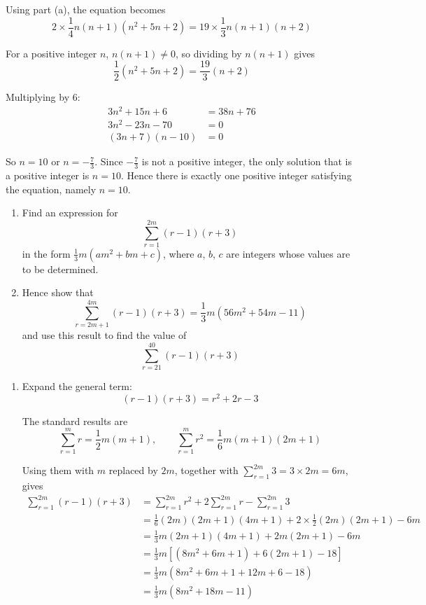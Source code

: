 \documentclass[leqno]{article}
\begin{document}
\begin{enumerate}[
  label=\textbf{\arabic*.},
  leftmargin=*,
  topsep=0pt,
  partopsep=0pt,
  parsep=0pt
]
\begin{djsSolution}
\begin{enumerate}[label=\textbf{(\alph*)}, start=1]
Using part (a), the equation becomes
\[
2\times\frac14 n(n+1)\left(n^2+5n+2\right)=19\times\frac13 n(n+1)(n+2)
\]

For a positive integer \(n\), \(n(n+1)\neq 0\), so dividing by \(n(n+1)\) gives
\[
\frac12\left(n^2+5n+2\right)=\frac{19}{3}(n+2)
\]

Multiplying by \(6\):
\begin{align*}
3n^2+15n+6&=38n+76\\
3n^2-23n-70&=0\\
(3n+7)(n-10)&=0
\end{align*}

So \(n=10\) or \(n=-\frac73\). Since \(-\frac73\) is not a positive integer, the only solution that is a positive integer is \(n=10\). Hence there is exactly one positive integer satisfying the equation, namely \(n=10\).
\end{enumerate}
\end{djsSolution}

\newpage

\questionitem

\begin{enumerate}[label=\textbf{(\alph*)}]
  \item Find an expression for
  \[\sum_{r=1}^{2m}(r-1)(r+3)\]
  in the form $\frac{1}{3}m(am^2+bm+c)$, where $a$, $b$, $c$ are integers whose values are to be determined.  \\
  \item Hence show that
  \[\sum_{r=2m+1}^{4m}(r-1)(r+3)=\dfrac{1}{3}m\left(56m^2+54m-11\right)\]
  and use this result to find the value of
  \[\sum_{r=21}^{40}(r-1)(r+3)\] 
\end{enumerate}

\vspace*{10pt}

\begin{djsSolution}
\begin{enumerate}[label=\textbf{(\alph*)}, start=1]
  \item Expand the general term:
\[
(r-1)(r+3)=r^2+2r-3
\]

The standard results are
\[
\sum_{r=1}^{m} r=\frac12 m(m+1),\qquad \sum_{r=1}^{m} r^2=\frac16 m(m+1)(2m+1)
\]

Using them with \(m\) replaced by \(2m\), together with \(\sum_{r=1}^{2m}3=3\times 2m=6m\), gives
\begin{align*}
\sum_{r=1}^{2m}(r-1)(r+3)&=\sum_{r=1}^{2m}r^2+2\sum_{r=1}^{2m}r-\sum_{r=1}^{2m}3\\
&=\frac16(2m)(2m+1)(4m+1)+2\times\frac12(2m)(2m+1)-6m\\
&=\frac13 m(2m+1)(4m+1)+2m(2m+1)-6m\\
&=\frac13 m\left[(8m^2+6m+1)+6(2m+1)-18\right]\\
&=\frac13 m\left(8m^2+6m+1+12m+6-18\right)\\
&=\frac13 m\left(8m^2+18m-11\right)
\end{align*}


\end{enumerate}
\end{djsSolution}
\end{enumerate}
\end{document}

